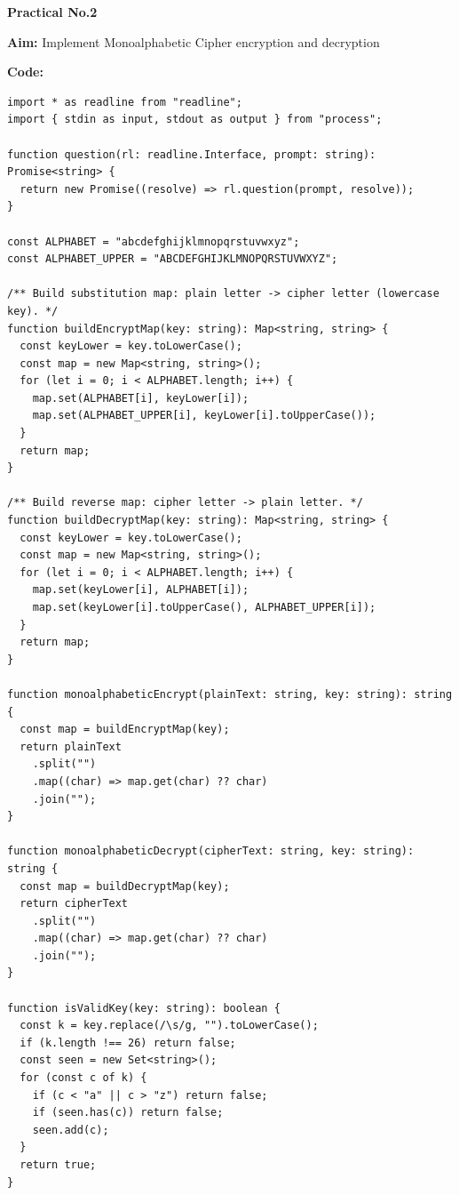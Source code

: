 \documentclass[a4paper,12pt]{article}
\begin{document}
\begin{center}
\Large\textbf{Practical No.2}
\end{center}

\vspace{0.5cm}

\noindent\textbf{Aim:} Implement Monoalphabetic Cipher encryption and decryption

\vspace{0.5cm}

\noindent\textbf{Code:}

\begin{verbatim}
import * as readline from "readline";
import { stdin as input, stdout as output } from "process";

function question(rl: readline.Interface, prompt: string): Promise<string> {
  return new Promise((resolve) => rl.question(prompt, resolve));
}

const ALPHABET = "abcdefghijklmnopqrstuvwxyz";
const ALPHABET_UPPER = "ABCDEFGHIJKLMNOPQRSTUVWXYZ";

/** Build substitution map: plain letter -> cipher letter (lowercase key). */
function buildEncryptMap(key: string): Map<string, string> {
  const keyLower = key.toLowerCase();
  const map = new Map<string, string>();
  for (let i = 0; i < ALPHABET.length; i++) {
    map.set(ALPHABET[i], keyLower[i]);
    map.set(ALPHABET_UPPER[i], keyLower[i].toUpperCase());
  }
  return map;
}

/** Build reverse map: cipher letter -> plain letter. */
function buildDecryptMap(key: string): Map<string, string> {
  const keyLower = key.toLowerCase();
  const map = new Map<string, string>();
  for (let i = 0; i < ALPHABET.length; i++) {
    map.set(keyLower[i], ALPHABET[i]);
    map.set(keyLower[i].toUpperCase(), ALPHABET_UPPER[i]);
  }
  return map;
}

function monoalphabeticEncrypt(plainText: string, key: string): string {
  const map = buildEncryptMap(key);
  return plainText
    .split("")
    .map((char) => map.get(char) ?? char)
    .join("");
}

function monoalphabeticDecrypt(cipherText: string, key: string): string {
  const map = buildDecryptMap(key);
  return cipherText
    .split("")
    .map((char) => map.get(char) ?? char)
    .join("");
}

function isValidKey(key: string): boolean {
  const k = key.replace(/\s/g, "").toLowerCase();
  if (k.length !== 26) return false;
  const seen = new Set<string>();
  for (const c of k) {
    if (c < "a" || c > "z") return false;
    if (seen.has(c)) return false;
    seen.add(c);
  }
  return true;
}


\end{verbatim}
\end{document}
